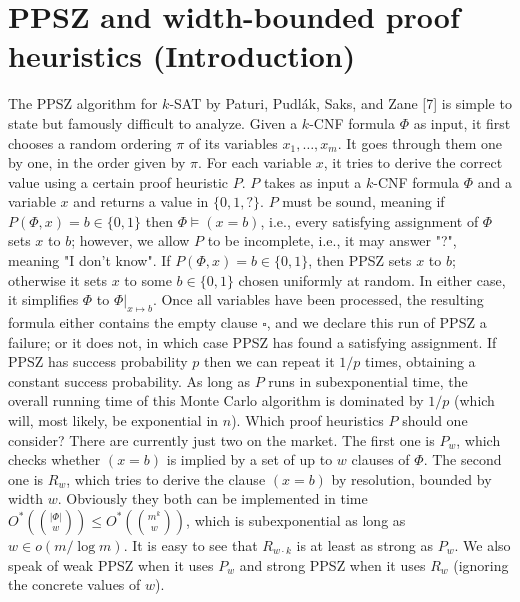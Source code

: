 \section*{PPSZ and width-bounded proof heuristics (Introduction)}
The PPSZ algorithm for $k$-SAT by Paturi, Pudl\'ak, Saks, and Zane [7] is simple to state but famously difficult to analyze. Given a $k$-CNF formula $\Phi$ as input, it first chooses a random ordering $\pi$ of its variables $x_1,\ldots,x_m$. It goes through them one by one, in the order given by $\pi$. For each variable $x$, it tries to derive the correct value using a certain proof heuristic $P$. $P$ takes as input a $k$-CNF formula $\Phi$ and a variable $x$ and returns a value in $\{0,1,?\}$. $P$ must be sound, meaning if $P(\Phi,x)=b\in\{0,1\}$ then $\Phi\models(x=b)$, i.e., every satisfying assignment of $\Phi$ sets $x$ to $b$; however, we allow $P$ to be incomplete, i.e., it may answer "?", meaning "I don't know". If $P(\Phi,x)=b\in\{0,1\}$, then PPSZ sets $x$ to $b$; otherwise it sets $x$ to some $b\in\{0,1\}$ chosen uniformly at random. In either case, it simplifies $\Phi$ to $\Phi|_{x\mapsto b}$. Once all variables have been processed, the resulting formula either contains the empty clause $\square$, and we declare this run of PPSZ a failure; or it does not, in which case PPSZ has found a satisfying assignment.
If PPSZ has success probability $p$ then we can repeat it $1/p$ times, obtaining a constant success probability. As long as $P$ runs in subexponential time, the overall running time of this Monte Carlo algorithm is dominated by $1/p$ (which will, most likely, be exponential in $n$). Which proof heuristics $P$ should one consider? There are currently just two on the market. The first one is $P_w$, which checks whether $(x=b)$ is implied by a set of up to $w$ clauses of $\Phi$. The second one is $R_w$, which tries to derive the clause $(x=b)$ by resolution, bounded by width $w$. Obviously they both can be implemented in time $O^*(\binom{|\Phi|}{w})\le O^*(\binom{m^k}{w})$, which is subexponential as long as $w\in o(m/\log m)$. It is easy to see that $R_{w\cdot k}$ is at least as strong as $P_w$. We also speak of weak PPSZ when it uses $P_w$ and strong PPSZ when it uses $R_w$ (ignoring the concrete values of $w$).

